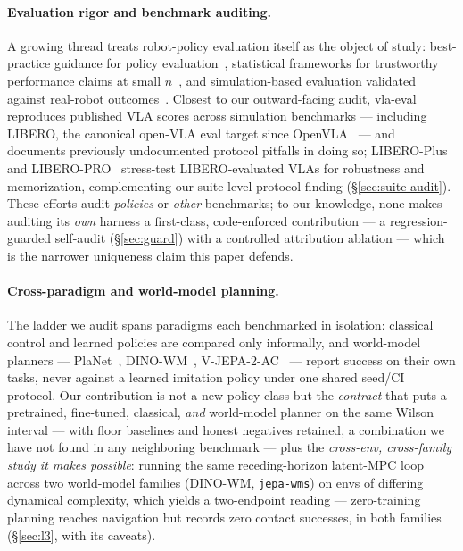 \documentclass[10pt]{article}
\begin{document}
\paragraph{Evaluation rigor and benchmark auditing.}
A growing thread treats robot-policy evaluation itself as the object of
study: best-practice guidance for policy
evaluation~\cite{kressgazit2024robot}, statistical frameworks for
trustworthy performance claims at small
$n$~\cite{vincent2024generalizable}, and simulation-based evaluation
validated against real-robot outcomes~\cite{li2024simpler}. Closest to
our outward-facing audit, vla-eval~\cite{choi2026vlaeval} reproduces
published VLA scores across simulation benchmarks --- including LIBERO,
the canonical open-VLA eval target since
OpenVLA~\cite{kim2024openvla} --- and documents previously undocumented
protocol pitfalls in doing so; LIBERO-Plus~\cite{fei2025liberoplus} and
LIBERO-PRO~\cite{zhou2025liberopro} stress-test LIBERO-evaluated VLAs for
robustness and memorization, complementing our suite-level protocol
finding (\S\ref{sec:suite-audit}). These efforts audit \emph{policies} or
\emph{other} benchmarks; to our knowledge, none makes auditing its
\emph{own} harness a first-class, code-enforced contribution --- a
regression-guarded self-audit (\S\ref{sec:guard}) with a controlled
attribution ablation --- which is the narrower uniqueness claim this
paper defends.

\paragraph{Cross-paradigm and world-model planning.}
The ladder we audit spans paradigms each benchmarked in isolation:
classical control and learned policies are compared only informally, and
world-model planners --- PlaNet~\cite{hafner2019planet},
DINO-WM~\cite{zhou2024dinowm}, V-JEPA-2-AC~\cite{assran2025vjepa2} ---
report success on their own tasks, never against a learned imitation
policy under one shared seed/CI protocol. Our contribution is not a new
policy class but the \emph{contract} that puts a pretrained, fine-tuned,
classical, \emph{and} world-model planner on the same Wilson interval ---
with floor baselines and honest negatives retained, a combination we have
not found in any neighboring benchmark --- plus the \emph{cross-env,
cross-family study it makes
possible}: running the same receding-horizon latent-MPC loop across two
world-model families (DINO-WM, \texttt{jepa-wms}) on envs of differing
dynamical complexity, which yields a two-endpoint reading --- zero-training
planning reaches navigation but records zero contact successes, in both
families (\S\ref{sec:l3}, with its caveats).
\end{document}
